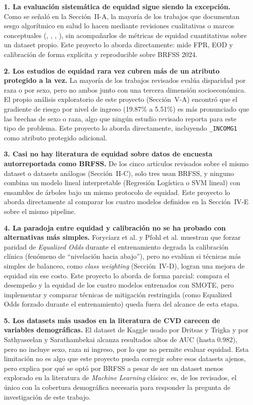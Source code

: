 \documentclass[conference]{IEEEtran}
\begin{document}
\textbf{1. La evaluación sistemática de equidad sigue siendo la excepción.} Como se señaló en la Sección~II-A, la mayoría de los trabajos que documentan sesgo algorítmico en salud lo hacen mediante revisiones cualitativas o marcos conceptuales (\cite{zhang2023ethics}, \cite{obra2025potential}, \cite{agarwal2023addressing}, \cite{huang2022evaluation}), sin acompañarlos de métricas de equidad cuantitativas sobre un dataset propio. Este proyecto lo aborda directamente: mide FPR, EOD y calibración de forma explícita y reproducible sobre BRFSS 2024.

\textbf{2. Los estudios de equidad rara vez cubren más de un atributo protegido a la vez.} La mayoría de los trabajos revisados evalúa disparidad por raza o por sexo, pero no ambos junto con una tercera dimensión socioeconómica. El propio análisis exploratorio de este proyecto (Sección~V-A) encontró que el gradiente de riesgo por nivel de ingreso (19.87\% a 5.51\%) es más pronunciado que las brechas de sexo o raza, algo que ningún estudio revisado reporta para este tipo de problema. Este proyecto lo aborda directamente, incluyendo \texttt{\_INCOMG1} como atributo protegido adicional.

\textbf{3. Casi no hay literatura de equidad sobre datos de encuesta autorreportada como BRFSS.} De los cinco artículos revisados sobre el mismo dataset o datasets análogos (Sección~II-C), solo tres usan BRFSS, y ninguno combina un modelo lineal interpretable (Regresión Logística o SVM lineal) con ensambles de árboles bajo un mismo protocolo de equidad. Este proyecto lo aborda directamente al comparar los cuatro modelos definidos en la Sección~IV-E sobre el mismo pipeline.

\textbf{4. La paradoja entre equidad y calibración no se ha probado con alternativas más simples.} Foryciarz et al. \cite{foryciarz2022evaluating} y Pfohl et al. \cite{pfohl2021empirical} muestran que forzar paridad de \textit{Equalized Odds} durante el entrenamiento degrada la calibración clínica (fenómeno de ``nivelación hacia abajo''), pero no evalúan si técnicas más simples de balanceo, como \textit{class weighting} (Sección~IV-D), logran una mejora de equidad sin ese costo. Este proyecto lo aborda de forma parcial: compara el desempeño y la equidad de los cuatro modelos entrenados con SMOTE, pero implementar y comparar técnicas de mitigación restringida (como Equalized Odds forzado durante el entrenamiento) queda fuera del alcance de esta etapa.

\textbf{5. Los datasets más usados en la literatura de CVD carecen de variables demográficas.} El dataset de Kaggle usado por Dritsas y Trigka \cite{dritsas2023efficient} y por Sathyaseelan y Sarathambekai \cite{sathyaseelan2025comparative} alcanza resultados altos de AUC (hasta 0.982), pero no incluye sexo, raza ni ingreso, por lo que no permite evaluar equidad. Esta limitación no es algo que este proyecto pueda corregir sobre esos datasets ajenos, pero explica por qué se optó por BRFSS a pesar de ser un dataset menos explorado en la literatura de \textit{Machine Learning} clásico: es, de los revisados, el único con la cobertura demográfica necesaria para responder la pregunta de investigación de este trabajo.
\end{document}
